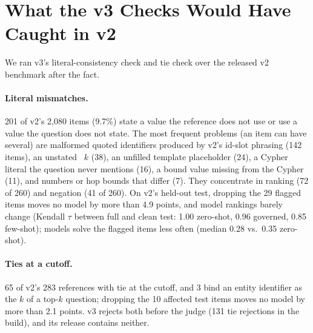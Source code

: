 \section{What the v3 Checks Would Have Caught in v2}
\label{app:v2audit}
We ran v3's literal-consistency check and tie check over the released v2 benchmark after the fact.

\paragraph{Literal mismatches.} 201 of v2's 2,080 items (9.7\%) state a value the reference does not use or use a value the question does not state. The most frequent problems (an item can have several) are malformed quoted identifiers produced by v2's id-slot phrasing (142 items), an unstated ~$k$ (38), an unfilled template placeholder (24), a Cypher literal the question never mentions (16), a bound value missing from the Cypher (11), and numbers or hop bounds that differ (7). They concentrate in ranking (72 of 260) and negation (41 of 260). On v2's held-out test, dropping the 29 flagged items moves no model by more than 4.9 points, and model rankings barely change (Kendall $\tau$ between full and clean test: 1.00 zero-shot, 0.96 governed, 0.85 few-shot); models solve the flagged items less often (median 0.28 vs.\ 0.35 zero-shot).

\paragraph{Ties at a  cutoff.} 65 of v2's 283 references with  tie at the cutoff, and 3 bind an entity identifier as the $k$ of a top-$k$ question; dropping the 10 affected test items moves no model by more than 2.1 points. v3 rejects both before the judge (131 tie rejections in the build), and its release contains neither.
